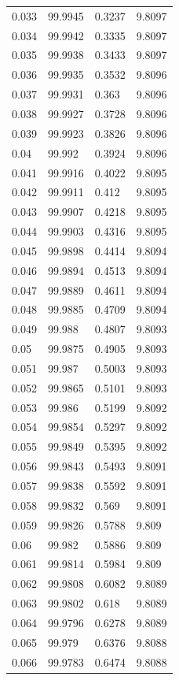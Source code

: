\begin{tabular}{llll}
0.033 & 99.9945 & 0.3237 & 9.8097 \\
0.034 & 99.9942 & 0.3335 & 9.8097 \\
0.035 & 99.9938 & 0.3433 & 9.8097 \\
0.036 & 99.9935 & 0.3532 & 9.8096 \\
0.037 & 99.9931 & 0.363 & 9.8096 \\
0.038 & 99.9927 & 0.3728 & 9.8096 \\
0.039 & 99.9923 & 0.3826 & 9.8096 \\
0.04 & 99.992 & 0.3924 & 9.8096 \\
0.041 & 99.9916 & 0.4022 & 9.8095 \\
0.042 & 99.9911 & 0.412 & 9.8095 \\
0.043 & 99.9907 & 0.4218 & 9.8095 \\
0.044 & 99.9903 & 0.4316 & 9.8095 \\
0.045 & 99.9898 & 0.4414 & 9.8094 \\
0.046 & 99.9894 & 0.4513 & 9.8094 \\
0.047 & 99.9889 & 0.4611 & 9.8094 \\
0.048 & 99.9885 & 0.4709 & 9.8094 \\
0.049 & 99.988 & 0.4807 & 9.8093 \\
0.05 & 99.9875 & 0.4905 & 9.8093 \\
0.051 & 99.987 & 0.5003 & 9.8093 \\
0.052 & 99.9865 & 0.5101 & 9.8093 \\
0.053 & 99.986 & 0.5199 & 9.8092 \\
0.054 & 99.9854 & 0.5297 & 9.8092 \\
0.055 & 99.9849 & 0.5395 & 9.8092 \\
0.056 & 99.9843 & 0.5493 & 9.8091 \\
0.057 & 99.9838 & 0.5592 & 9.8091 \\
0.058 & 99.9832 & 0.569 & 9.8091 \\
0.059 & 99.9826 & 0.5788 & 9.809 \\
0.06 & 99.982 & 0.5886 & 9.809 \\
0.061 & 99.9814 & 0.5984 & 9.809 \\
0.062 & 99.9808 & 0.6082 & 9.8089 \\
0.063 & 99.9802 & 0.618 & 9.8089 \\
0.064 & 99.9796 & 0.6278 & 9.8089 \\
0.065 & 99.979 & 0.6376 & 9.8088 \\
0.066 & 99.9783 & 0.6474 & 9.8088 \\

\end{tabular}
